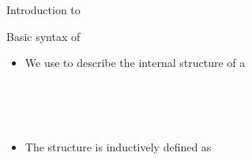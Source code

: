 \documentclass[12pt, mathserif,handout]{beamer}
\begin{document}
\begin{frame}[allowframebreaks,t]{Introduction to \wog}
\begin{itemize}

\end{itemize}


\end{frame}



\begin{frame}[allowframebreaks,t]{Basic syntax of \tig}




\begin{itemize}

\item We use \tig to describe the internal structure of a \wogs

\begin{code}\>\<
\\
\>  \<[19]%
\>[19]\AgdaSymbol{:} \<%
\\
\>  \AgdaSymbol{(} \AgdaSymbol{:} \AgdaSymbol{)} \<[19]%
\>[19]\AgdaSymbol{:} \<%
\\
\>  \<[19]%
\>[19]\AgdaSymbol{:} \AgdaSymbol{\{} \AgdaSymbol{:} \AgdaSymbol{\}(} \AgdaSymbol{:}  \AgdaSymbol{)}  \<%
\>\<\end{code}

\item The structure is inductively defined as
\small{
\begin{code}\>\<%
\\
\>   \<%
\\
\>[0]\<[2]%
\>[2]\AgdaInductiveConstructor{*} \<[6]%
\>[6]\AgdaSymbol{:}  \<%
\\
\>[0]\<[2]%
\>[2] \AgdaSymbol{:} \AgdaSymbol{\{} \AgdaSymbol{:}  \AgdaSymbol{\}(}  \AgdaSymbol{:}  \AgdaSymbol{)}   \<%
\\
\end{code}
}

\end{itemize}
\end{frame}
\end{document}
